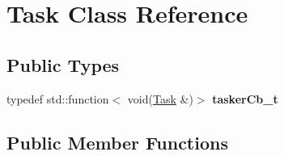 \hypertarget{class_task}{}\section{Task Class Reference}
\label{class_task}
\subsection*{Public Types}
\begin{DoxyCompactItemize}
\item 
\mbox{\label{class_task_a3c14c4e1c42ebd30ba57a1d6da0d74bb}} 
typedef std\+::function$<$ void(\hyperlink{class_task}{Task} \&)$>$ {\bfseries tasker\+Cb\+\_\+t}
\end{DoxyCompactItemize}
\subsection*{Public Member Functions}
